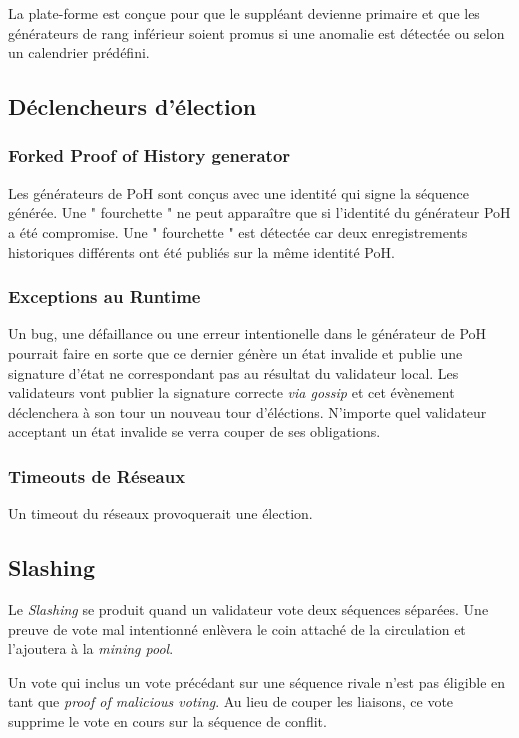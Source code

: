 \documentclass[12pt]{article}
\begin{document}
La plate-forme est conçue pour que le suppléant devienne primaire et que les générateurs de rang inférieur soient promus si une anomalie est détectée ou selon un calendrier prédéfini.
\subsection{Déclencheurs d'élection}
\subsubsection{Forked Proof of History generator}

Les générateurs de PoH sont conçus avec une identité qui signe la séquence générée. Une " fourchette " ne peut apparaître que si l'identité du générateur PoH a été compromise. Une " fourchette " est détectée car deux enregistrements historiques différents ont été publiés sur la même identité PoH.

\subsubsection{Exceptions au Runtime}
Un bug, une défaillance ou une erreur intentionelle dans le générateur de PoH pourrait faire en sorte que ce dernier génère un état invalide et publie une signature d'état ne correspondant pas au résultat du validateur local.  Les validateurs vont publier la signature correcte \textit{via gossip} et cet évènement déclenchera à son tour un nouveau tour d'éléctions. N'importe quel validateur acceptant un état invalide se verra couper de ses obligations.

\subsubsection{Timeouts de Réseaux}

Un timeout du réseaux provoquerait une élection.

\subsection{Slashing}

Le \textit{Slashing} se produit quand un validateur vote deux séquences séparées. Une preuve de vote mal intentionné enlèvera le coin attaché de la circulation et l'ajoutera à la \textit{mining pool}.

Un vote qui inclus un vote précédant sur une séquence rivale n'est pas éligible en tant que \textit{proof of malicious voting}. Au lieu de couper les liaisons, ce vote supprime le vote en cours sur la séquence de conflit.
\end{document}

